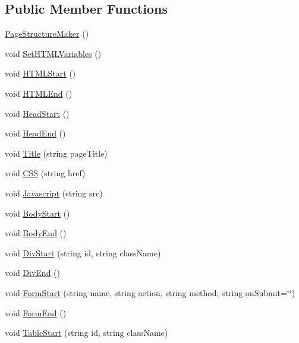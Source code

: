 \subsection*{Public Member Functions}
\begin{DoxyCompactItemize}
\item 
\hyperlink{classPageStructureMaker_a95e6305a2b5121840fb5b74297a040ce}{Page\-Structure\-Maker} ()
\item 
void \hyperlink{classPageStructureMaker_aaf78d67380c400cc0057c6519276f721}{Set\-H\-T\-M\-L\-Variables} ()
\item 
void \hyperlink{classPageStructureMaker_ad25d6abc983253567e2370882fc1b407}{H\-T\-M\-L\-Start} ()
\item 
void \hyperlink{classPageStructureMaker_a63b877af1c2c8de8332e3f7eb4c2c2b0}{H\-T\-M\-L\-End} ()
\item 
void \hyperlink{classPageStructureMaker_a14312134cb108f91f2e6d9cbd6916e97}{Head\-Start} ()
\item 
void \hyperlink{classPageStructureMaker_ad64115d592b0989b422a93f85278186e}{Head\-End} ()
\item 
void \hyperlink{classPageStructureMaker_a81e902ddc0c0287df1ba0f614a3774d6}{Title} (string page\-Title)
\item 
void \hyperlink{classPageStructureMaker_aacdb11817f8ab246bc59c552e04e862d}{C\-S\-S} (string href)
\item 
void \hyperlink{classPageStructureMaker_ac221d1169f4dbcef6adb00938919193d}{Javascript} (string src)
\item 
void \hyperlink{classPageStructureMaker_ab7a645675166f34fac99f1ed8feb7c27}{Body\-Start} ()
\item 
void \hyperlink{classPageStructureMaker_ac91e234e2d54dedd9d7e556fabf21d2b}{Body\-End} ()
\item 
void \hyperlink{classPageStructureMaker_a927f92889555dd316c129f706be86a5c}{Div\-Start} (string id, string class\-Name)
\item 
void \hyperlink{classPageStructureMaker_a2913e76bf188ed777dcd33003ef6207d}{Div\-End} ()
\item 
void \hyperlink{classPageStructureMaker_aa87c4296495fb0a175f40701deda7745}{Form\-Start} (string name, string action, string method, string on\-Submit=\char`\"{}\char`\"{})
\item 
void \hyperlink{classPageStructureMaker_a65d97f23bb543f3db5201b2009f7f65a}{Form\-End} ()
\item 
void \hyperlink{classPageStructureMaker_a04e68e69005f3933e0f496c3db474daf}{Table\-Start} (string id, string class\-Name)

\end{DoxyCompactItemize}
